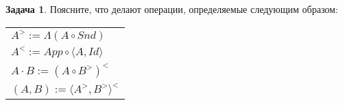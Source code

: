 \documentclass[10pt]{article}
\theoremstyle{definition}
\newtheorem{Pm}{Задача}[subsection]
\begin{document}
\begin{Pm}
Поясните, что делают операции, определяемые следующим образом:
\vspace{0.3cm}

\begin{tabular}{l}
$A ^> := \Lambda(A \circ Snd)$\\
$A ^< := App \circ \langle A, Id \rangle$\\
$A \cdot B := (A \circ B^>)^<$\\
$(A,B) := \langle A^>, B^> \rangle ^<$
\end{tabular}
\end{Pm}
\end{document}
